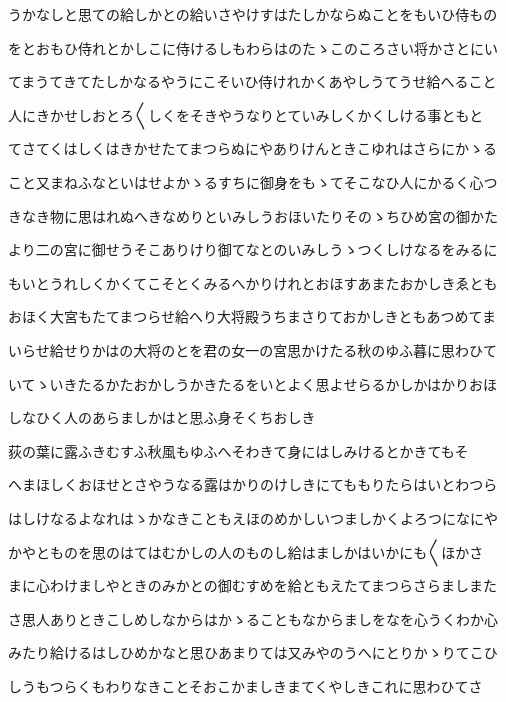 \documentclass[a4paper,11pt,landscape]{ltjtarticle}
\begin{document}
\par\medskip
うかなしと思ての給しかとの給いさやけすはたしかならぬことをもいひ侍もの
\par\medskip
をとおもひ侍れとかしこに侍けるしもわらはのたゝこのころさい将かさとにい
\par\medskip
てまうてきてたしかなるやうにこそいひ侍けれかくあやしうてうせ給へること
\par\medskip
人にきかせしおとろ〱しくをそきやうなりとていみしくかくしける事ともと
\par\medskip
てさてくはしくはきかせたてまつらぬにやありけんときこゆれはさらにかゝる
\par\medskip
こと又まねふなといはせよかゝるすちに御身をもゝてそこなひ人にかるく心つ
\par\medskip
きなき物に思はれぬへきなめりといみしうおほいたりそのゝちひめ宮の御かた
\par\medskip
より二の宮に御せうそこありけり御てなとのいみしうゝつくしけなるをみるに
\par\medskip
もいとうれしくかくてこそとくみるへかりけれとおほすあまたおかしきゑとも
\par\medskip
おほく大宮もたてまつらせ給へり大将殿うちまさりておかしきともあつめてま
\par\medskip
いらせ給せりかはの大将のとを君の女一の宮思かけたる秋のゆふ暮に思わひて
\par\medskip
いてゝいきたるかたおかしうかきたるをいとよく思よせらるかしかはかりおほ
\par\medskip
しなひく人のあらましかはと思ふ身そくちおしき
\par\medskip
荻の葉に露ふきむすふ秋風もゆふへそわきて身にはしみけるとかきてもそ
\par\medskip
へまほしくおほせとさやうなる露はかりのけしきにてももりたらはいとわつら
\par\medskip
はしけなるよなれはゝかなきこともえほのめかしいつましかくよろつになにや
\par\medskip
かやとものを思のはてはむかしの人のものし給はましかはいかにも〱ほかさ
\par\medskip
まに心わけましやときのみかとの御むすめを給ともえたてまつらさらましまた
\par\medskip
さ思人ありときこしめしなからはかゝることもなからましをなを心うくわか心
\par\medskip
みたり給けるはしひめかなと思ひあまりては又みやのうへにとりかゝりてこひ
\par\medskip
しうもつらくもわりなきことそおこかましきまてくやしきこれに思わひてさ
\par\medskip
\end{document}
